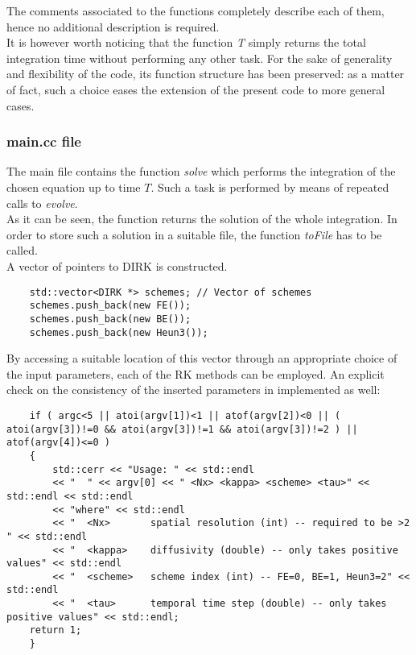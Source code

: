 \documentclass[11pt]{article}
\theoremstyle{theorem}
\theoremstyle{definition}
\begin{document}
The comments associated to the functions completely describe each of them, hence no additional description is required.\\
It is however worth noticing that the function \emph{T} simply returns the total integration time without performing any other task. For the sake of generality and flexibility of the code, its function structure has been preserved: as a matter of fact, such a choice eases the extension of the present code to more general cases.\\

\subsubsection{main.cc file}
The main file contains the function \emph{solve} which performs the integration of the chosen equation up to time $T$. Such a task is performed by means of repeated calls to \emph{evolve}.\\
As it can be seen, the function returns the solution of the whole integration. In order to store such a solution in a suitable file, the function \emph{toFile} has to be called.\\
A vector of pointers to DIRK is constructed.\\

\begin{lstlisting}
	std::vector<DIRK *> schemes; // Vector of schemes
	schemes.push_back(new FE());
	schemes.push_back(new BE());
	schemes.push_back(new Heun3());
\end{lstlisting}

By accessing a suitable location of this vector through an appropriate choice of the input parameters, each of the RK methods can be employed. An explicit check on the consistency of the inserted parameters in implemented as well:\\

\begin{lstlisting}
	if ( argc<5 || atoi(argv[1])<1 || atof(argv[2])<0 || ( atoi(argv[3])!=0 && atoi(argv[3])!=1 && atoi(argv[3])!=2 ) || atof(argv[4])<=0 )
	{
		std::cerr << "Usage: " << std::endl
		<< "  " << argv[0] << " <Nx> <kappa> <scheme> <tau>" << std::endl << std::endl
		<< "where" << std::endl
		<< "  <Nx>       spatial resolution (int) -- required to be >2 " << std::endl
		<< "  <kappa>    diffusivity (double) -- only takes positive values" << std::endl
		<< "  <scheme>   scheme index (int) -- FE=0, BE=1, Heun3=2" << std::endl
		<< "  <tau>      temporal time step (double) -- only takes positive values" << std::endl;
	return 1;
	}
\end{lstlisting}
\end{document}
